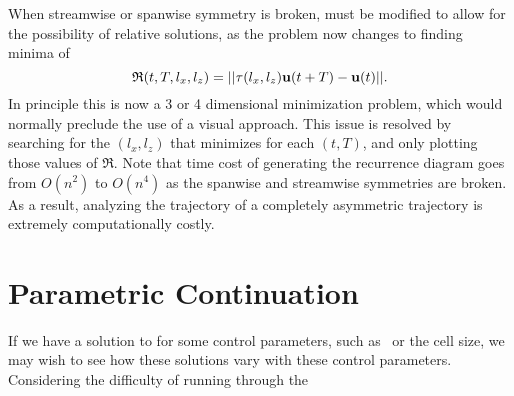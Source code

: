  When streamwise or spanwise symmetry is broken,  must be modified to allow for the possibility of relative solutions, as the problem now changes to finding minima of 
 \begin{equation}\label{eq:4DrecurrenceEQ}
 \mathfrak{R}(t,T,l_x,l_z) = ||\tau(l_x,l_z)\mathbf{u}(t+T) - \mathbf{u}(t)||.
  \end{equation}
   In principle this is now a 3 or 4 dimensional minimization problem, which would normally preclude the use of a visual approach. This issue is resolved by searching for the $(l_x,l_z)$ that minimizes  for each $(t,T)$, and only plotting those values of $\mathfrak{R}$. Note that time cost of generating the recurrence diagram goes from $O(n^2)$ to $O(n^4)$ as the spanwise and streamwise symmetries are broken. As a result, analyzing the trajectory of a completely asymmetric trajectory is extremely computationally costly.
 
 \section{Parametric Continuation} 
 
 If we have a solution to  for some control parameters, such as \ReN\ or the cell size, we may wish to see how these solutions vary with these control parameters. Considering the difficulty of running through the 

 
 
 